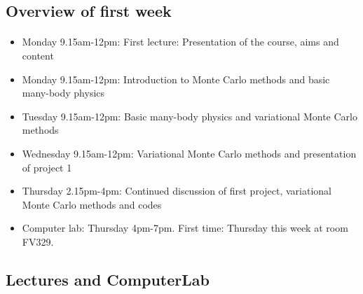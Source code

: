 \documentclass[%
twoside,                 %
final,                   %
10pt]{article}
\begin{document}
\noindent





\subsection*{Overview of first week}


\paragraph{}
\begin{itemize}
  \item Monday 9.15am-12pm: First lecture: Presentation of the course, aims and content

  \item Monday 9.15am-12pm: Introduction to Monte Carlo methods and basic many-body physics

  \item Tuesday 9.15am-12pm: Basic many-body physics and variational Monte Carlo methods

  \item Wednesday 9.15am-12pm: Variational Monte Carlo methods and presentation of project 1

  \item Thursday 2.15pm-4pm: Continued discussion of first project, variational Monte Carlo methods and codes

  \item Computer lab: Thursday 4pm-7pm. First time: Thursday this week at room FV329.
\end{itemize}

\noindent



\subsection*{Lectures and ComputerLab}


\end{document}
